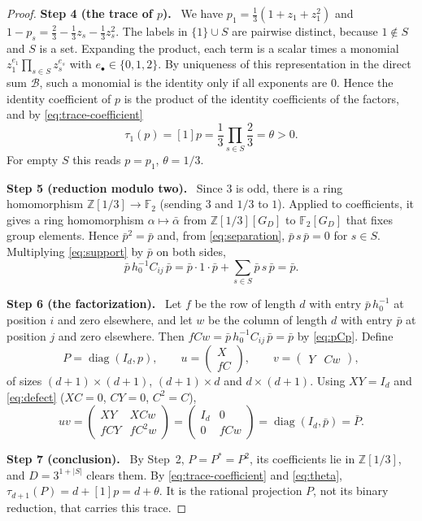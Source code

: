 \documentclass[11pt]{article}
\theoremstyle{remark}
\numberwithin{equation}{section}
\newcommand{\F}{\mathbb F}
\newcommand{\Z}{\mathbb Z}
\newcommand{\diag}{\operatorname{diag}}
\newcommand{\step}[1]{\par\smallskip\noindent\textbf{Step #1.}\ }
\begin{document}
\begin{proof}
\step{4 (the trace of $p$)}
We have $p_1=\frac13(1+z_1+z_1^2)$ and $1-p_s=\frac23-\frac13z_s-\frac13z_s^2$. The labels in $\{1\}\cup S$ are pairwise distinct, because $1\notin S$ and $S$ is a set. Expanding the product, each term is a scalar times a monomial $z_1^{e_1}\prod_{s\in S}z_s^{e_s}$ with $e_\bullet\in\{0,1,2\}$. By uniqueness of this representation in the direct sum $\mathcal B$, such a monomial is the identity only if all exponents are $0$. Hence the identity coefficient of $p$ is the product of the identity coefficients of the factors, and by \eqref{eq:trace-coefficient}
\begin{equation}\label{eq:theta}
 \tau_1(p)=[1]p=\frac13\prod_{s\in S}\frac23=\theta>0.
\end{equation}
For empty $S$ this reads $p=p_1$, $\theta=1/3$.

\step{5 (reduction modulo two)}
Since $3$ is odd, there is a ring homomorphism $\Z[1/3]\to\F_2$ (sending $3$ and $1/3$ to $1$). Applied to coefficients, it gives a ring homomorphism $\alpha\mapsto\bar\alpha$ from $\Z[1/3][G_D]$ to $\F_2[G_D]$ that fixes group elements. Hence $\bar p^2=\bar p$ and, from \eqref{eq:separation}, $\bar p\,s\,\bar p=0$ for $s\in S$. Multiplying \eqref{eq:support} by $\bar p$ on both sides,
\begin{equation}\label{eq:pCp}
 \bar p\,h_0^{-1}C_{ij}\,\bar p=\bar p\cdot1\cdot\bar p+\sum_{s\in S}\bar p\,s\,\bar p=\bar p.
\end{equation}

\step{6 (the factorization)}
Let $f$ be the row of length $d$ with entry $\bar p\,h_0^{-1}$ at position $i$ and zero elsewhere, and let $w$ be the column of length $d$ with entry $\bar p$ at position $j$ and zero elsewhere. Then $fCw=\bar p\,h_0^{-1}C_{ij}\,\bar p=\bar p$ by \eqref{eq:pCp}. Define
\[
 P=\diag(I_d,p),\qquad
 u=\begin{pmatrix}X\\fC\end{pmatrix},\qquad
 v=\begin{pmatrix}Y&Cw\end{pmatrix},
\]
of sizes $(d+1)\times(d+1)$, $(d+1)\times d$ and $d\times(d+1)$. Using $XY=I_d$ and \eqref{eq:defect} ($XC=0$, $CY=0$, $C^2=C$),
\[
 uv=\begin{pmatrix}XY&XCw\\fCY&fC^2w\end{pmatrix}
   =\begin{pmatrix}I_d&0\\0&fCw\end{pmatrix}
   =\diag(I_d,\bar p)=\bar P.
\]

\step{7 (conclusion)}
By Step~2, $P=P^*=P^2$, its coefficients lie in $\Z[1/3]$, and $D=3^{1+|S|}$ clears them. By \eqref{eq:trace-coefficient} and \eqref{eq:theta}, $\tau_{d+1}(P)=d+[1]p=d+\theta$. It is the rational projection $P$, not its binary reduction, that carries this trace.
\end{proof}
\end{document}
